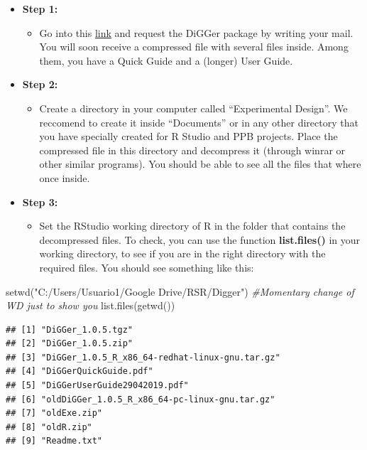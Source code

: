 \documentclass[
]{book}
\newenvironment{Shaded}{\begin{snugshade}}{\end{snugshade}}
\newcommand{\CommentTok}[1]{\textcolor[rgb]{0.56,0.35,0.01}{\textit{#1}}}
\newcommand{\FunctionTok}[1]{\textcolor[rgb]{0.00,0.00,0.00}{#1}}
\newcommand{\NormalTok}[1]{#1}
\newcommand{\StringTok}[1]{\textcolor[rgb]{0.31,0.60,0.02}{#1}}
\providecommand{\tightlist}{%
  \setlength{\itemsep}{0pt}\setlength{\parskip}{0pt}}
\begin{document}
\begin{itemize}
\item
  \textbf{Step 1:}

  \begin{itemize}
  \tightlist
  \item
    Go into this \href{http://nswdpibiom.org/austatgen/software/}{link} and request the DiGGer package by writing your mail. You will soon receive a compressed file with several files inside. Among them, you have a Quick Guide and a (longer) User Guide.
  \end{itemize}
\item
  \textbf{Step 2:}

  \begin{itemize}
  \tightlist
  \item
    Create a directory in your computer called ``Experimental Design''. We reccomend to create it inside ``Documents'' or in any other directory that you have specially created for R Studio and PPB projects. Place the compressed file in this directory and decompress it (through winrar or other similar programs). You should be able to see all the files that where once inside.
  \end{itemize}
\item
  \textbf{Step 3: }

  \begin{itemize}
  \tightlist
  \item
    Set the RStudio working directory of R in the folder that contains the decompressed files. To check, you can use the function \textbf{list.files()} in your working directory, to see if you are in the right directory with the required files. You should see something like this:
  \end{itemize}
\end{itemize}

\begin{Shaded}
\begin{Highlighting}[]
\FunctionTok{setwd}\NormalTok{(}\StringTok{"C:/Users/Usuario1/Google Drive/RSR/Digger"}\NormalTok{) }\CommentTok{\#Momentary change of  WD just to show you}
 \FunctionTok{list.files}\NormalTok{(}\FunctionTok{getwd}\NormalTok{())}
\end{Highlighting}
\end{Shaded}

\begin{verbatim}
## [1] "DiGGer_1.0.5.tgz"                             
## [2] "DiGGer_1.0.5.zip"                             
## [3] "DiGGer_1.0.5_R_x86_64-redhat-linux-gnu.tar.gz"
## [4] "DiGGerQuickGuide.pdf"                         
## [5] "DiGGerUserGuide29042019.pdf"                  
## [6] "oldDiGGer_1.0.5_R_x86_64-pc-linux-gnu.tar.gz" 
## [7] "oldExe.zip"                                   
## [8] "oldR.zip"                                     
## [9] "Readme.txt"
\end{verbatim}
\end{document}
